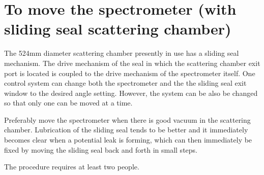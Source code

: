 \documentclass[11pt]{report}
\begin{document}
\section {To move the spectrometer (with sliding seal scattering chamber)}

The 524mm diameter scattering chamber presently in use has a sliding seal mechanism.
The drive mechanism of the seal in which the scattering chamber exit port is 
located is coupled to the drive mechanism of the spectrometer itself.
One control system can change both the spectrometer and the the sliding seal exit window to the desired angle setting. However, the system can be also be changed so that only 
one can be moved at a time.

\bigskip
{}

\bigskip
Preferably move the spectrometer when there is good vacuum in the scattering chamber.
Lubrication of the sliding seal tends to be better 
and it immediately becomes clear when a potential leak is forming, which can then
immediately be fixed by moving the sliding seal back and forth in small steps.

The procedure requires at least two people. 
\end{document}
